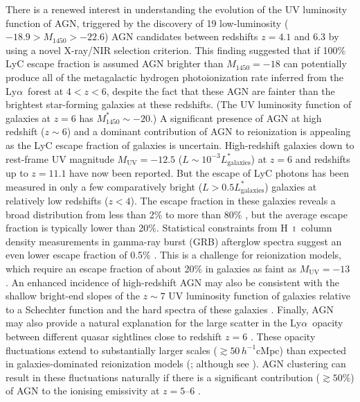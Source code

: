 \documentclass[fleqn,usenatbib]{mnras}
\def\lya{Ly$\alpha$~}
\def\HI{\hbox{H~$\scriptstyle\rm I$}}
\begin{document}
There is a renewed interest in understanding the evolution of the UV
luminosity function of AGN, triggered by the discovery of 19
low-luminosity ($-18.9>M_{1450}>-22.6$) AGN candidates between
redshifts $z=4.1$ and $6.3$ by \citet{2015AA...578A..83G} using a
novel X-ray/NIR selection criterion.  This finding suggested that if
100\% LyC escape fraction is assumed AGN brighter than $M_{1450}=-18$
can potentially produce all of the metagalactic hydrogen
photoionization rate inferred from the \lya forest at $4<z<6$, despite
the fact that these AGN are fainter than the brightest star-forming
galaxies at these redshifts.  (The UV luminosity function of galaxies
at $z=6$ has $M^*_{1450}\sim -20$.)  A significant presence of AGN at
high redshift ($z\sim 6$) and a dominant contribution of AGN to
reionization is appealing as the LyC escape fraction of galaxies is
uncertain.  High-redshift galaxies down to rest-frame UV magnitude
$M_\mathrm{UV}=-12.5$ ($L\sim 10^{-3}L^*_\mathrm{galaxies}$) at $z=6$
\citep{2017ApJ...835..113L} and redshifts up to $z=11.1$
\citep{2016ApJ...819..129O} have now been reported.  But the escape of
LyC photons has been measured in only a few comparatively bright
($L>0.5L^*_\mathrm{galaxies}$) galaxies at relatively low redshifts
($z < 4$).  The escape fraction in these galaxies reveals a broad
distribution from less than 2\% to more than 80\%
\citep{2010ApJ...725.1011V, 2011ApJ...736...41B, 2015ApJ...804...17S,
  2015ApJ...810..107M, 2016A&A...585A..48G, 2017MNRAS.468..389J,
  2018arXiv180506071S, 2018arXiv180601741F, 2018arXiv180511621M,
  2018arXiv180303655C}, but the average escape fraction is typically
lower than 20\%.  Statistical constraints from \HI\ column density
measurements in gamma-ray burst (GRB) afterglow spectra suggest an
even lower escape fraction of 0.5\% \citep{2007ApJ...667L.125C,
  2009ApJS..185..526F, 2018arXiv180507318T}.  This is a challenge for
reionization models, which require an escape fraction of about 20\% in
galaxies as faint as $M_\mathrm{UV}=-13$ \citep{2016PASA...33...37F,
  2015ApJ...802L..19R, 2016MNRAS.457.4051K}.  An enhanced incidence of
high-redshift AGN may also be consistent with the shallow bright-end
slopes of the $z\sim 7$ UV luminosity function of galaxies relative to
a Schechter function \citep{2012MNRAS.426.2772B, 2014MNRAS.440.2810B,
  2014ApJ...792...76B, 2015MNRAS.452.1817B} and the hard spectra of
these galaxies \citep{2015MNRAS.450.1846S, 2015MNRAS.454.1393S,
  2017MNRAS.464..469S}.  Finally, AGN may also provide a natural
explanation for the large scatter in the \lya opacity between
different quasar sightlines close to redshift $z=6$
\citep{2015MNRAS.447.3402B, 2018arXiv180208177B}.
These opacity fluctuations extend to substantially larger scales
($\gtrsim 50\, h^{-1}$cMpc) than expected in galaxies-dominated
reionization models (\citealt{2015MNRAS.453.2943C}; although see
\citealt{2016MNRAS.460.1328D, 2015ApJ...813L..38D,
  2018arXiv180308932B}).  AGN clustering can result in these
fluctuations naturally if there is a significant contribution
($\gtrsim 50\%$) of AGN to the ionising emissivity at $z=5$--$6$
\citep{2017MNRAS.465.3429C}.
\end{document}
